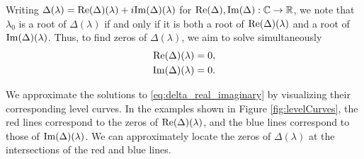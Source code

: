 \documentclass[12pt, oneside, a4paper]{article}
\begin{document}
Writing $\Delta(\lambda)=\mathrm{Re}(\Delta)(\lambda) + i\mathrm{Im}(\Delta)(\lambda)$ for $\mathrm{Re}(\Delta), \mathrm{Im}(\Delta): \mathbb C\to\mathbb R$, we note that $\lambda_0$ is a root of $\Delta(\lambda)$ if and only if it is both a root of $\mathrm{Re}(\Delta)(\lambda)$ and a root of $\mathrm{Im}(\Delta)(\lambda)$. Thus, to find zeros of $\Delta(\lambda)$, we aim to solve simultaneously
\begin{subequations}\label{eq:delta_real_imaginary}
    \begin{align}
        \mathrm{Re}(\Delta)(\lambda) &= 0,\\
        \mathrm{Im}(\Delta)(\lambda) &= 0.
    \end{align}
\end{subequations}


We approximate the solutions to \eqref{eq:delta_real_imaginary} by visualizing their corresponding level curves. In the examples shown in Figure \ref{fig:levelCurves}, the red lines correspond to the zeros of $\mathrm{Re}(\Delta)(\lambda)$, and the blue lines correspond to those of $\mathrm{Im}(\Delta)(\lambda)$. We can approximately locate the zeros of $\Delta(\lambda)$ at the intersections of the red and blue lines. 
\end{document}
